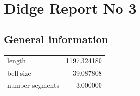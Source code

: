 \documentclass{article}
\begin{document}
\begin{centering}
\begin{figure}[!htb]
\end{figure}
\end{centering}
\section{Didge Report No 3}

\subsection{General information}
\begin{centering}

\begin{figure}[!htb]
\end{figure}
\begin{tabular}{lr}
\toprule
         length & 1197.324180 \\
      bell size &   39.087808 \\
number segments &    3.000000 \\
\bottomrule
\end{tabular}
\end{centering}
\end{document}

